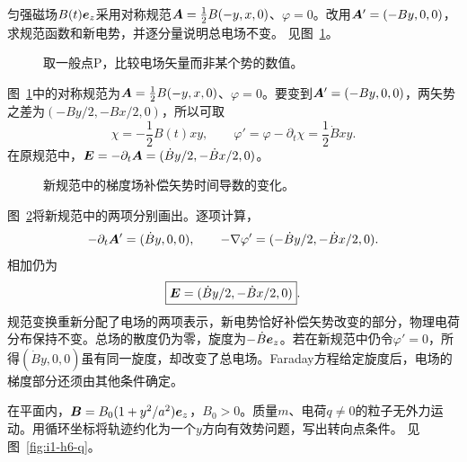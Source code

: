 \begin{exercise}[时间依赖规范不能只改变矢势]\label{ex:i1-h5}
匀强磁场$B(t)\bm{e}_z$采用对称规范$\bm{A}=\tfrac12B(-y,x,0)$、$\varphi=0$。改用$\bm{A}'=(-By,0,0)$，求规范函数和新电势，并逐分量说明总电场不变。 见图~\ref{fig:i1-h5-q}。
\end{exercise}

\begin{figure}[H]\centering
{}
\caption{取一般点P，比较电场矢量而非某个势的数值。}\label{fig:i1-h5-q}
\end{figure}
\begin{solution}
图~\ref{fig:i1-h5-q}中的对称规范为$\bm{A}=\tfrac12B(-y,x,0)$、$\varphi=0$。要变到$\bm{A}'=(-By,0,0)$，两矢势之差为$(-By/2,-Bx/2,0)$，所以可取
\[\chi=-\frac12B(t)xy,\qquad
\varphi'=\varphi-\partial_t\chi=\frac12\dot Bxy.
\]
在原规范中，$\bm{E}=-\partial_t\bm{A}=(\dot By/2,-\dot Bx/2,0)$。


\begin{figure}[H]\centering
{}
\caption{新规范中的梯度场补偿矢势时间导数的变化。}\label{fig:i1-h5-s}
\end{figure}

图~\ref{fig:i1-h5-s}将新规范中的两项分别画出。逐项计算，
\[-\partial_t\bm{A}'=(\dot By,0,0),\qquad
-\nabla\varphi'=(-\dot By/2,-\dot Bx/2,0).
\]
相加仍为
\[\boxed{\bm{E}=(\dot By/2,-\dot Bx/2,0)}.
\]
规范变换重新分配了电场的两项表示，新电势恰好补偿矢势改变的部分，物理电荷分布保持不变。总场的散度仍为零，旋度为$-\dot B\bm{e}_z$。若在新规范中仍令$\varphi'=0$，所得$(\dot By,0,0)$虽有同一旋度，却改变了总电场。Faraday方程给定旋度后，电场的梯度部分还须由其他条件确定。
\end{solution}

\begin{exercise}[非均匀静磁场中的有效势]\label{ex:i1-h6}
在平面内，$\bm{B}=B_0(1+y^2/a^2)\bm{e}_z$，$B_0>0$。质量$m$、电荷$q\ne0$的粒子无外力运动。用循环坐标将轨迹约化为一个$y$方向有效势问题，写出转向点条件。 见图~\ref{fig:i1-h6-q}。
\end{exercise}

